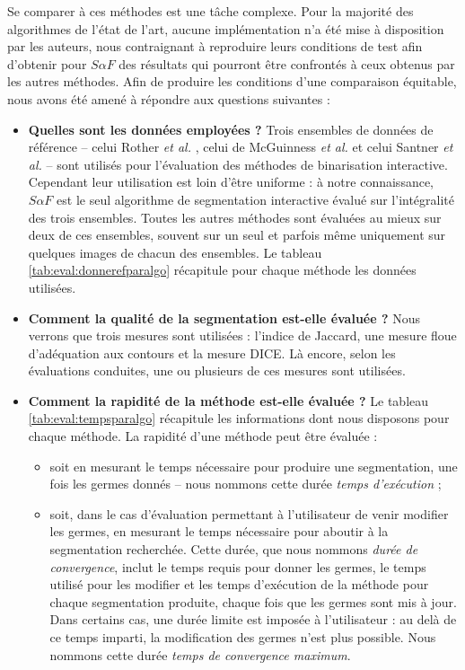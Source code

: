 \begin{emodif}
Se comparer à ces méthodes est une tâche complexe. Pour la majorité des algorithmes de l'état de l'art, aucune implémentation n'a été mise à disposition par les auteurs, nous contraignant à reproduire leurs conditions de test afin d'obtenir pour $S \alpha F$ des résultats qui pourront être confrontés à ceux obtenus par les autres méthodes. Afin de produire les conditions d'une comparaison équitable, nous avons été amené à répondre aux questions suivantes :
\begin{itemize}
\item \textbf{Quelles sont les données employées ?} Trois ensembles de données de référence -- celui Rother \textit{et al.} \cite{rother2004grabcut}, celui de McGuinness \textit{et al.} \cite{mcguinness2010comparative}  et celui Santner \textit{et al.} \cite{santner2010interactive} -- sont utilisés pour l'évaluation des méthodes de binarisation interactive. Cependant leur utilisation est loin d'être uniforme : à notre connaissance, $S \alpha F$ est le seul algorithme de segmentation interactive évalué sur l'intégralité des trois ensembles. Toutes les autres méthodes sont évaluées au mieux sur deux de ces ensembles, souvent sur un seul et parfois même uniquement sur quelques images de chacun des ensembles. Le tableau \ref{tab:eval:donnerefparalgo} récapitule pour chaque méthode les données utilisées.
\item \textbf{Comment la qualité de la segmentation est-elle évaluée ?} Nous verrons que trois mesures sont utilisées  : l'indice de Jaccard, une mesure floue d'adéquation aux contours et la mesure DICE. Là encore, selon les évaluations conduites, une ou plusieurs de ces mesures sont utilisées.
\item \textbf{Comment la rapidité de la méthode est-elle évaluée ? } Le tableau \ref{tab:eval:tempsparalgo} récapitule les informations dont nous disposons pour chaque méthode. La rapidité d'une méthode peut être évaluée :
\begin{itemize}
\item soit en mesurant le temps nécessaire pour produire une segmentation, une fois les germes donnés -- nous nommons cette durée \textit{temps d'exécution} ;
\item soit, dans le cas d'évaluation permettant à l'utilisateur de venir modifier les germes, en mesurant le temps nécessaire pour aboutir à la segmentation recherchée. Cette durée, que nous nommons \textit{durée de convergence},  inclut le temps requis pour donner les germes, le temps utilisé pour les modifier et les temps d'exécution de la méthode pour chaque segmentation produite, chaque fois que les germes sont mis à jour. Dans certains cas, une durée limite est imposée à l'utilisateur : au delà de ce temps imparti, la modification des germes n'est plus possible. Nous nommons cette durée \textit{temps de convergence maximum}. 
\end{itemize}
\end{itemize}


\end{emodif}
